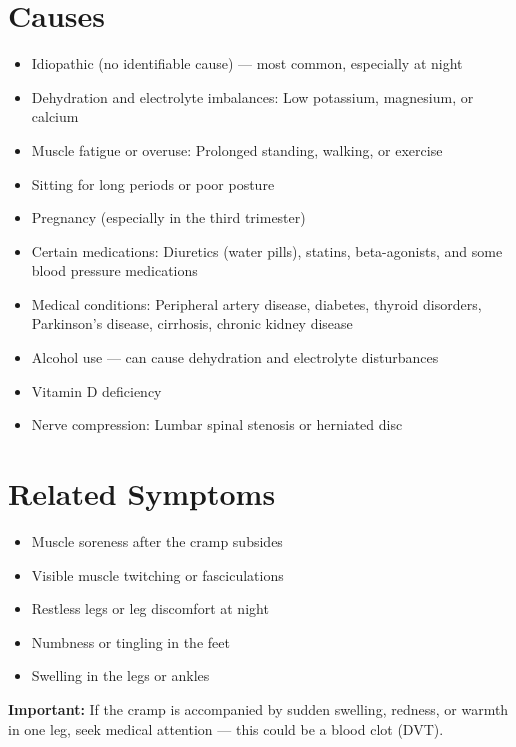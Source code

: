 \section*{Causes}
\begin{itemize}
  \item Idiopathic (no identifiable cause) — most common, especially at night
  \item Dehydration and electrolyte imbalances: Low potassium, magnesium, or calcium
  \item Muscle fatigue or overuse: Prolonged standing, walking, or exercise
  \item Sitting for long periods or poor posture
  \item Pregnancy (especially in the third trimester)
  \item Certain medications: Diuretics (water pills), statins, beta-agonists, and some blood pressure medications
  \item Medical conditions: Peripheral artery disease, diabetes, thyroid disorders, Parkinson's disease, cirrhosis, chronic kidney disease
  \item Alcohol use — can cause dehydration and electrolyte disturbances
  \item Vitamin D deficiency
  \item Nerve compression: Lumbar spinal stenosis or herniated disc
\end{itemize}

\section*{Related Symptoms}
\begin{itemize}
  \item Muscle soreness after the cramp subsides
  \item Visible muscle twitching or fasciculations
  \item Restless legs or leg discomfort at night
  \item Numbness or tingling in the feet
  \item Swelling in the legs or ankles
\end{itemize}
\textbf{Important:} If the cramp is accompanied by sudden swelling, redness, or warmth in one leg, seek medical attention — this could be a blood clot (DVT).

